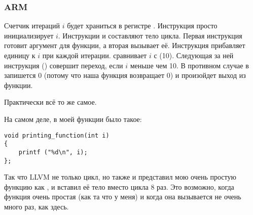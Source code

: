 \subsubsection{ARM}

\myparagraph{\NonOptimizingKeilVI (\ARMMode)}



Счетчик итераций $i$ будет храниться в регистре .
Инструкция  просто инициализирует $i$.
Инструкции  и  составляют тело цикла. 
Первая инструкция готовит аргумент для функции, \ttf а вторая вызывает её.
Инструкция  прибавляет единицу к $i$ при каждой итерации.
 сравнивает $i$ с  (10). 
Следующая за ней инструкция  () совершит переход, если $i$ меньше чем 10.
В противном случае в  запишется 0 (потому что наша функция возвращает 0) 
и произойдет выход из функции.

\myparagraph{\OptimizingKeilVI (\ThumbMode)}



Практически всё то же самое.

\myparagraph{\OptimizingXcodeIV (\ThumbTwoMode)}
\label{ARM_unrolled_loops}



На самом деле, в моей функции \ttf было такое:

\begin{lstlisting}[style=customc]
void printing_function(int i)
{
    printf ("%d\n", i);
};
\end{lstlisting}

Так что LLVM не только  цикл, 
но также и представил мою очень простую функцию \ttf как ,
и вставил её тело вместо цикла 8 раз. 
Это возможно, когда функция очень простая (как та что у меня) и когда
она вызывается не очень много раз, как здесь.






